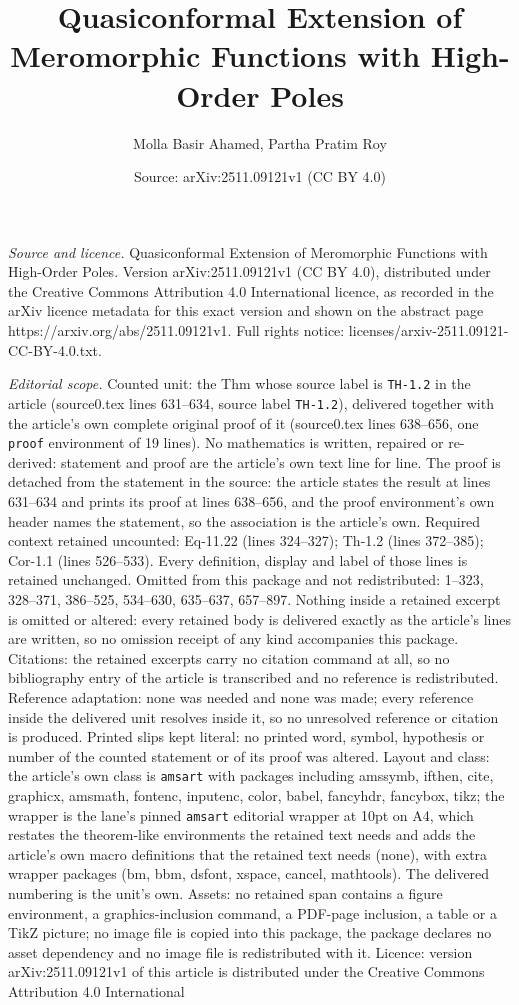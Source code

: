 \documentclass[10pt,a4paper]{amsart}
\title[Quasiconformal Extension of Meromorphic Functions with High-]{Quasiconformal Extension of Meromorphic Functions with High-Order Poles}
\author{Molla Basir Ahamed, Partha Pratim Roy}
\date{Source: arXiv:2511.09121v1 (CC BY 4.0)}
\begin{document}
\maketitle

\noindent\emph{Source and licence.} Quasiconformal Extension of Meromorphic Functions with High-Order Poles. Version arXiv:2511.09121v1 (CC BY 4.0), distributed under the Creative Commons Attribution 4.0 International licence, as recorded in the arXiv licence metadata for this exact version and shown on the abstract page https://arxiv.org/abs/2511.09121v1. Full rights notice: licenses/arxiv-2511.09121-CC-BY-4.0.txt.\par\smallskip

\noindent\textit{Editorial scope.} Counted unit: the Thm whose source label is \texttt{TH-1.2} in the article (source0.tex lines 631--634, source label \texttt{TH-1.2}), delivered together with the article's own complete original proof of it (source0.tex lines 638--656, one \texttt{proof} environment of 19 lines). No mathematics is written, repaired or re-derived: statement and proof are the article's own text line for line. The proof is detached from the statement in the source: the article states the result at lines 631--634 and prints its proof at lines 638--656, and the proof environment's own header names the statement, so the association is the article's own. Required context retained uncounted: Eq-11.22 (lines 324--327); Th-1.2 (lines 372--385); Cor-1.1 (lines 526--533). Every definition, display and label of those lines is retained unchanged. Omitted from this package and not redistributed: 1--323, 328--371, 386--525, 534--630, 635--637, 657--897. Nothing inside a retained excerpt is omitted or altered: every retained body is delivered exactly as the article's lines are written, so no omission receipt of any kind accompanies this package. Citations: the retained excerpts carry no citation command at all, so no bibliography entry of the article is transcribed and no reference is redistributed. Reference adaptation: none was needed and none was made; every reference inside the delivered unit resolves inside it, so no unresolved reference or citation is produced. Printed slips kept literal: no printed word, symbol, hypothesis or number of the counted statement or of its proof was altered. Layout and class: the article's own class is \texttt{amsart} with packages including amssymb, ifthen, cite, graphicx, amsmath, fontenc, inputenc, color, babel, fancyhdr, fancybox, tikz; the wrapper is the lane's pinned \texttt{amsart} editorial wrapper at 10pt on A4, which restates the theorem-like environments the retained text needs and adds the article's own macro definitions that the retained text needs (none), with extra wrapper packages (bm, bbm, dsfont, xspace, cancel, mathtools). The delivered numbering is the unit's own. Assets: no retained span contains a figure environment, a graphics-inclusion command, a PDF-page inclusion, a table or a TikZ picture; no image file is copied into this package, the package declares no asset dependency and no image file is redistributed with it. Licence: version arXiv:2511.09121v1 of this article is distributed under the Creative Commons Attribution 4.0 International 
\end{document}
